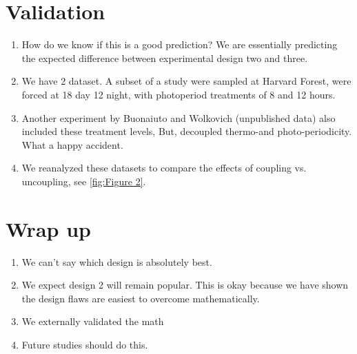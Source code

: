 \documentclass[12pt]{article}\usepackage[]{graphicx}\usepackage[]{color}
\begin{document}
\section{Validation}
\begin{enumerate}
  \item How do we know if this is a good prediction? We are essentially predicting the expected difference between experimental design two and three.
\item We have 2 dataset. A subset of a \citet{Flynn2018} study were sampled  at Harvard Forest,  were forced at 18 day 12 night, with photoperiod treatments of 8 and 12 hours. 
\item Another experiment by Buonaiuto and Wolkovich (unpublished data) also included these treatment levels, But, decoupled thermo-and photo-periodicity. What a happy accident.
\item We reanalyzed these datasets to compare the effects of coupling vs. uncoupling, see \ref{fig:Figure 2}.

\end{enumerate}
 
 \section{Wrap up}
 \begin{enumerate}
\item We can't say which design is absolutely best.
\item We expect design 2 will remain popular. This is okay because we have shown the design flaws are easiest to overcome mathematically.  
\item We externally validated the math
\item Future studies should do this.
 \end{enumerate}

  
\end{document}
